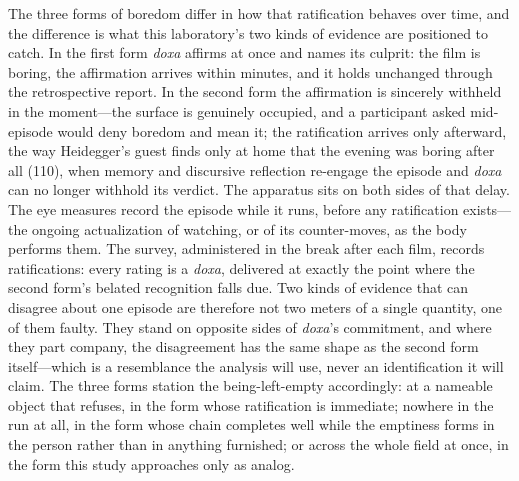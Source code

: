 The three forms of boredom differ in how that ratification behaves over time, and the
difference is what this laboratory's two kinds of evidence are positioned to catch. In the
first form \textit{doxa} affirms at once and names its culprit: the film is boring, the
affirmation arrives within minutes, and it holds unchanged through the retrospective report. In
the second form the affirmation is sincerely withheld in the moment---the surface is genuinely
occupied, and a participant asked mid-episode would deny boredom and mean it; the ratification
arrives only afterward, the way Heidegger's guest finds only at home that the evening was
boring after all (110), when memory and discursive reflection re-engage the episode and
\textit{doxa} can no longer withhold its verdict. The apparatus sits on both sides of that
delay. The eye measures record the episode while it runs, before any ratification exists---the
ongoing actualization of watching, or of its counter-moves, as the body performs them. The
survey, administered in the break after each film, records ratifications: every rating is a
\textit{doxa}, delivered at exactly the point where the second form's belated recognition falls
due. Two kinds of evidence that can disagree about one episode are therefore not two meters of
a single quantity, one of them faulty. They stand on opposite sides of \textit{doxa}'s
commitment, and where they part company, the disagreement has the same shape as the second form
itself---which is a resemblance the analysis will use, never an identification it will claim.
The three forms station the being-left-empty accordingly: at a nameable object that refuses, in
the form whose ratification is immediate; nowhere in the run at all, in the form whose chain
completes well while the emptiness forms in the person rather than in anything furnished; or
across the whole field at once, in the form this study approaches only as analog.

